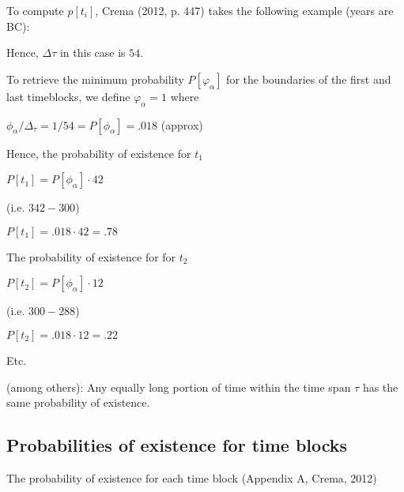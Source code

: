 \documentclass[a4paper,12pt,english]{sphinxhowto}
\begin{document}
To compute \(p[t_i]\), Crema (2012, p. 447) takes the following example (years are BC):
\begin{quote}

\begin{sphinxVerbatim}[commandchars=\\\{\},formatcom=\footnotesize]
    
            

       
\end{sphinxVerbatim}
\end{quote}

Hence, \(\Delta \tau\) in this case is \(54\).



To retrieve the minimum probability \(P[\varphi_\alpha]\) for the boundaries of the first and last time\sphinxhyphen{}blocks,
we define \(\varphi_\alpha = 1\) where

\(\phi_\alpha / \Delta_\tau = 1/54 = P[\phi_\alpha] = .018\) (approx)

Hence, the probability of existence for \(t_1\)

\(P[t_1] = P[\phi_\alpha] \cdot 42\)

(i.e. \(342 - 300\))

\(P[t_1] = .018 \cdot 42  =  .78\)

The probability of existence for for \(t_2\)

\(P[t_2] = P[\phi_\alpha] \cdot 12\)

(i.e. \(300 - 288\))

\(P[t_2] = .018 \cdot 12  =  .22\)

Etc.


 (among others): Any equally long portion of time within the time span \(\tau\) has the same probability of existence.



\subsection{Probabilities of existence for time blocks}
\label{\detokenize{Uncertainty:probabilities-of-existence-for-time-blocks}}
The probability of existence for each time block (Appendix A, Crema, 2012)
\end{document}
